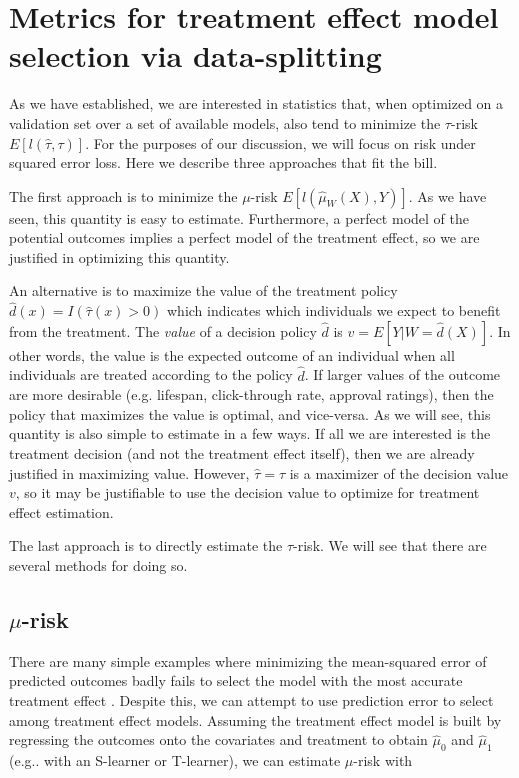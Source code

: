 \section{Metrics for treatment effect model selection via data-splitting}
\label{approaches}

As we have established, we are interested in statistics that, when optimized on a validation set over a set of available models, also tend to minimize the $\tau$-risk $E[l(\hat\tau, \tau)]$. For the purposes of our discussion, we will focus on risk under squared error loss. Here we describe three approaches that fit the bill.

The first approach is to minimize the $\mu$-risk $E[l(\hat\mu_{W}(X), Y)]$. As we have seen, this quantity is easy to estimate. Furthermore, a perfect model of the potential outcomes implies a perfect model of the treatment effect, so we are justified in optimizing this quantity.

An alternative is to maximize the value of the treatment policy $\hat d(x) = I(\hat\tau(x) > 0)$ which indicates which individuals we expect to benefit from the treatment. The \emph{value} of a decision policy $\hat d$ is $v = E[Y|W=\hat d(X)]$. In other words, the value is the expected outcome of an individual when all individuals are treated according to the policy $\hat d$. If larger values of the outcome are more desirable (e.g. lifespan, click-through rate, approval ratings), then the policy that maximizes the value is optimal, and vice-versa. As we will see, this quantity is also simple to estimate in a few ways. If all we are interested is the treatment decision (and not the treatment effect itself), then we are already justified in maximizing value. However, $\hat\tau = \tau$ is a maximizer of the decision value $v$, so it may be justifiable to use the decision value to optimize for treatment effect estimation.

The last approach is to directly estimate the $\tau$-risk. We will see that there are several methods for doing so.

\subsection{$\mu$-risk}
\label{sec:pred-error}

There are many simple examples where minimizing the mean-squared error of predicted outcomes badly fails to select the model with the most accurate treatment effect \cite{Rolling:2013kz}. Despite this, we can attempt to use prediction error to select among treatment effect models. Assuming the treatment effect model is built by regressing the outcomes onto the covariates and treatment to obtain $\hat\mu_0$ and $\hat\mu_1$ (e.g.. with an S-learner or T-learner), we can estimate $\mu$-risk with

